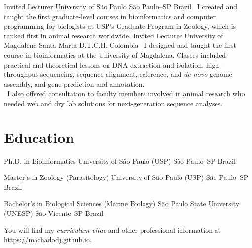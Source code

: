 \documentclass[11pt, letterpaper, sans]{moderncv}
\begin{document}
%
{Invited Lecturer}
{University of São Paulo}
{São Paulo--SP}
{Brazil}
{
\textbullet~I created and taught the first graduate-level courses in bioinformatics and computer programming for biologists at USP's Graduate Program in Zoology, which is ranked first in animal research worldwide.
}
%
{Invited Lecturer}
{University of Magdalena}
{Santa Marta D.T.C.H.}
{Colombia}
{
\textbullet~I designed and taught the first course in bioinformatics at the University of Magdalena. Classes included practical and theoretical lessons on DNA extraction and isolation, high-throughput sequencing, sequence alignment, reference, and \textit{de novo} genome assembly, and gene prediction and annotation.\\
\textbullet~I also offered consultation to faculty members involved in animal research who needed web and dry lab solutions for next-generation sequence analyses.
}


\vspace{-1em}

\section{Education}

{Ph.D. in Bioinformatics}
{University of São Paulo (USP)}
{São Paulo--SP}
{Brazil}
{}

{Master's in Zoology (Parasitology)}
{University of São Paulo (USP)}
{São Paulo--SP}
{Brazil}
{}

{Bachelor's in Biological Sciences (Marine Biology)}
{São Paulo State University (UNESP)}
{São Vicente--SP}
{Brazil}
{}

You will find my \textit{curriculum vitae} and other professional information at \url{https://machadodj.github.io}.
\end{document}
